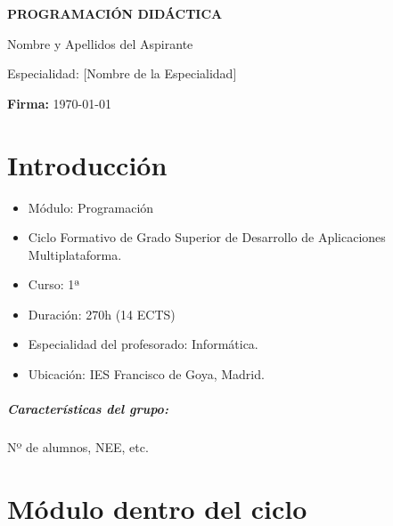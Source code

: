 \documentclass{didactica}
\begin{document}
\begin{titlepage}
    \centering
    \vspace*{2cm}
    {\LARGE\bfseries PROGRAMACIÓN DIDÁCTICA\par}
    \vspace{1.5cm}
    {\Large Nombre y Apellidos del Aspirante\par}
    \vspace{0.5cm}
    {\Large Especialidad: [Nombre de la Especialidad]\par}
    \vfill
    \textbf{Firma: \hrulefill} %
    \vspace{1.5cm}
    \today
\end{titlepage}


\tableofcontents
\newpage

\chapter{Introducción}

\begin{itemize}
    \item Módulo: Programación
    \item Ciclo Formativo de Grado Superior de Desarrollo de Aplicaciones Multiplataforma.
    \item Curso: 1ª
    \item Duración: 270h (14 ECTS)
    \item Especialidad del profesorado: Informática.
    \item Ubicación: IES Francisco de Goya, Madrid.
\end{itemize}

 \paragraph{Características del grupo:}

 Nº de alumnos, NEE, etc.
 





\chapter{Módulo dentro del ciclo}

\end{document}

